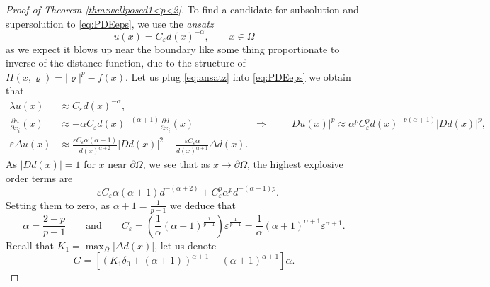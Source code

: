 \documentclass[11pt,reqno]{amsart}
\numberwithin{figure}{section}
\theoremstyle{plain}
\theoremstyle{remark}
\numberwithin{equation}{section}
\begin{document}
\begin{appendices}
\begin{proof} [Proof of Theorem \ref{thm:wellposed1<p<2}] To find a candidate for subsolution and supersolution to \eqref{eq:PDEeps}, we use the \emph{ansatz}
\begin{equation}\label{eq:ansatz}
    u(x) = C_\varepsilon d(x)^{-\alpha}, \qquad x\in \Omega
\end{equation}
as we expect it blows up near the boundary like some thing proportionate to inverse of the distance function, due to the structure of $H(x,\varrho) = |\varrho|^p - f(x)$. Let us plug \eqref{eq:ansatz} into \eqref{eq:PDEeps} we obtain that 
\begin{align*}
    \lambda u(x) &\approx C_\varepsilon d(x)^{-\alpha},\\
    \frac{\partial u}{\partial x_i}(x) &\approx -\alpha C_\varepsilon d(x)^{-(\alpha+1)} \frac{\partial d}{\partial x_i}(x) \qquad\qquad\qquad \Longrightarrow\qquad |Du (x)|^p \approx \alpha^p C_\varepsilon^p d(x)^{-p(\alpha+1)}|D d(x)|^p,\\
    \varepsilon\Delta u(x) &\approx \frac{\varepsilon C_\varepsilon\alpha(\alpha+1)}{d(x)^{\alpha+2}}|D d(x)|^2 - \frac{\varepsilon C_\varepsilon\alpha}{d(x)^{\alpha+1}}\Delta d(x).
\end{align*}
As $|D d(x)| = 1$ for $x$ near $\partial\Omega$, we see that as $x\to \partial \Omega$, the highest explosive order terms are
\begin{equation*}
        -\varepsilon C_\varepsilon \alpha(\alpha+1)d^{-(\alpha+2)} + C_\varepsilon^p \alpha^p d^{-(\alpha+1)p}.
\end{equation*}
Setting them to zero, as $\alpha+1 = \frac{1}{p-1}$ we deduce that 
\begin{equation}\label{e:relation}
    \displaystyle\alpha = \frac{2-p}{p-1} \qquad\text{and}\qquad C_\varepsilon = \left(\frac{1}{\alpha}(\alpha+1)^\frac{1}{p-1}\right) \varepsilon^{\frac{1}{p-1}} = \frac{1}{\alpha}(\alpha+1)^{\alpha+1}\varepsilon^{\alpha+1}.
\end{equation}
Recall that $K_1 = \max_{\overline{\Omega}}|\Delta d(x)|$, let us denote
\begin{equation*}
    G = \left[\left(K_1\delta_0+(\alpha+1)\right)^{\alpha+1} - (\alpha+1)^{\alpha+1}\right]\alpha.
\end{equation*}


\end{proof}
\end{appendices}
\end{document}
